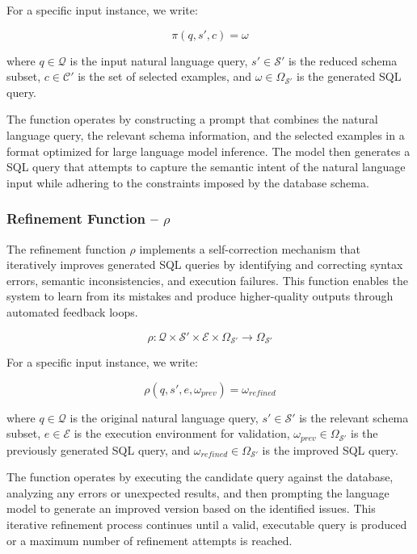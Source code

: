 For a specific input instance, we write:

$$
\pi(q, s', c) = \omega
$$

\vspace{0.5em}

where $q \in \mathcal{Q}$ is the input natural language query, $s' \in \mathcal{S}'$ is
the reduced schema subset, $c \in \mathcal{C}'$ is the set of selected examples,
and $\omega \in \Omega_{\mathcal{S}'}$ is the generated SQL query.

The function operates by constructing a prompt that combines the natural language
query, the relevant schema information, and the selected examples in a format
optimized for large language model inference. The model then generates a SQL query
that attempts to capture the semantic intent of the natural language input while
adhering to the constraints imposed by the database schema.

\subsubsection{Refinement Function – $\rho$}\label{design:refinement-function}

The refinement function $\rho$ implements a self-correction mechanism that iteratively
improves generated SQL queries by identifying and correcting syntax errors,
semantic inconsistencies, and execution failures. This function enables the system
to learn from its mistakes and produce higher-quality outputs through automated
feedback loops.

$$
\rho: \mathcal{Q} \times \mathcal{S}' \times \mathcal{E} \times \Omega_{\mathcal{S}'} \rightarrow \Omega_{\mathcal{S}'}
$$

\vspace{0.5em}

For a specific input instance, we write:

$$
\rho(q, s', e, \omega_{prev}) = \omega_{refined}
$$

\vspace{0.5em}

where $q \in \mathcal{Q}$ is the original natural language query, $s' \in \mathcal{S}'$
is the relevant schema subset, $e \in \mathcal{E}$ is the execution environment for
validation, $\omega_{prev} \in \Omega_{\mathcal{S}'}$ is the previously generated SQL
query, and $\omega_{refined} \in \Omega_{\mathcal{S}'}$ is the improved SQL query.

The function operates by executing the candidate query against the database, analyzing
any errors or unexpected results, and then prompting the language model to generate
an improved version based on the identified issues. This iterative refinement
process continues until a valid, executable query is produced or a maximum number
of refinement attempts is reached.


